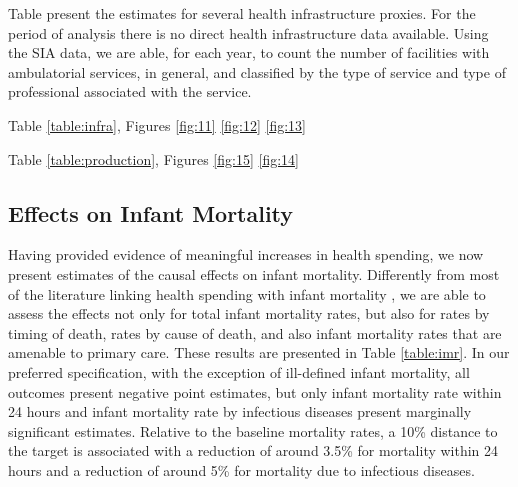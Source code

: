 Table present the estimates for several health infrastructure proxies. For the period of analysis there is no direct health infrastructure data available. Using the SIA data, we are able, for each year, to count the number of facilities with ambulatorial services, in general, and classified by the type of service and type of professional associated with the service. 

Table \ref{table:infra}, Figures \ref{fig:11} \ref{fig:12} \ref{fig:13}









Table \ref{table:production}, Figures \ref{fig:15} \ref{fig:14}







\subsection{Effects on Infant Mortality}

Having provided evidence of meaningful increases in health spending, we now present estimates of the causal effects on infant mortality. Differently from most of the literature linking health spending with infant mortality \citep{filmer1999,bokhari2007,moreno2015,nixon2006,gupta2002effectiveness,cremieux1999,bokhari2007}, we are able to assess the effects not only for total infant mortality rates, but also for rates by timing of death, rates by cause of death, and also infant mortality rates that are amenable to primary care. These results are presented in Table \ref{table:imr}. In our preferred specification, with the exception of ill-defined infant mortality, all outcomes present negative point estimates, but only infant mortality rate within 24 hours and infant mortality rate by infectious diseases present marginally significant estimates. Relative to the baseline mortality rates, a 10\% distance to the target is associated with a reduction of around 3.5\% for mortality within 24 hours and a reduction of around 5\% for mortality due to infectious diseases. 

